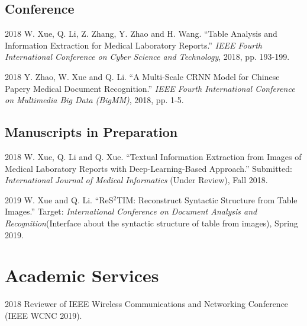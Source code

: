 \documentclass[12pt,letterpaper]{report}
\begin{document}
  \subsection*{Conference}

	\begin{tablist}

		\item[2018] \tab W. Xue, Q. Li, Z. Zhang, Y. Zhao and H. Wang. \enquote{Table Analysis and Information Extraction for Medical Laboratory Reports.} \textit{IEEE Fourth International Conference on Cyber Science and Technology}, 2018, pp. 193-199.

		\item[2018] \tab Y. Zhao, W. Xue and Q. Li. \enquote{A Multi-Scale CRNN Model for Chinese Papery Medical Document Recognition.} \textit{IEEE Fourth International Conference on Multimedia Big Data (BigMM)}, 2018, pp. 1-5.

  \end{tablist}



	\subsection*{Manuscripts in Preparation}

	\begin{tablist}

		\item[2018] \tab W. Xue, Q. Li and Q. Xue. \enquote{Textual Information Extraction from Images of Medical Laboratory Reports with Deep-Learning-Based Approach.} Submitted: \textit{International Journal of Medical Informatics} (Under Review), Fall 2018.

		\item[2019] \tab W. Xue and Q. Li. \enquote{ReS$^2$TIM: Reconstruct Syntactic Structure from Table Images.} Target: \textit{International Conference on Document Analysis and Recognition}(Interface about the syntactic structure of table from images), Spring 2019.

	\end{tablist}


  \section*{Academic Services}

	\begin{tablist}
		\item[2018] \tab Reviewer of IEEE Wireless Communications and Networking Conference (IEEE WCNC 2019).
	\end{tablist}
\end{document}
